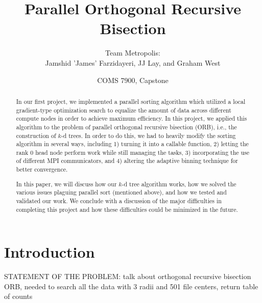 \documentclass{article}
\begin{document}
\title{Parallel Orthogonal Recursive Bisection}
\author{Team Metropolis: \\
		Jamshid 'James' Farzidayeri, JJ Lay, and Graham West}
\date{COMS 7900, Capstone}

\maketitle

\begin{abstract}
In our first project, we implemented a parallel sorting algorithm which utilized a local gradient-type optimization search to equalize the amount of data across different compute nodes in order to achieve maximum efficiency. In this project, we applied this algorithm to the problem of parallel orthogonal recursive bisection (ORB), i.e., the construction of $k$-d trees. In order to do this, we had to heavily modify the sorting algorithm in several ways, including 1) turning it into a callable function, 2) letting the rank 0 head node perform work while still managing the tasks, 3) incorporating the use of different MPI communicators, and 4) altering the adaptive binning technique for better convergence.

In this paper, we will discuss how our $k$-d tree algorithm works, how we solved the various issues plaguing parallel sort (mentioned above), and how we tested and validated our work. We conclude with a discussion of the major difficulties in completing this project and how these difficulties could be minimized in the future.
\end{abstract}


\tableofcontents


\section{Introduction}

STATEMENT OF THE PROBLEM: talk about orthogonal recursive bisection ORB, needed to search all the data with 3 radii and 501 file centers, return table of counts


\end{document}
